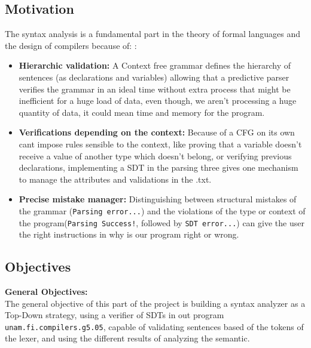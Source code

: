 \documentclass[letterpaper,12pt,oneside]{article}
\begin{document}
\subsection{Motivation}
The syntax analysis is a fundamental part in the theory of formal languages and the design of compilers because of: \cite{10.5555/576122}:
\begin{itemize}
    \item \textbf{Hierarchic validation:} A Context free grammar defines the hierarchy of sentences (as declarations and variables) allowing that a predictive parser verifies the grammar in an ideal time without extra process that might be inefficient for a huge load of data, even though, we aren't processing a huge quantity of data, it could mean time and memory for the program. 
    \item \textbf{Verifications depending on the context:} Because of a CFG on its own cant impose rules sensible to the context, like proving that a variable doesn't receive a value of another type which doesn't belong, or verifying previous declarations, implementing a SDT in the parsing three gives one mechanism to manage the attributes and validations in the .txt.
    \item \textbf{Precise mistake manager:} Distinguishing between structural mistakes of the grammar (\texttt{Parsing error...}) and the violations of the type or context of the program(\texttt{Parsing Success!}, followed by \texttt{SDT error...}) can give the user the right instructions in why is our program right or wrong.
\end{itemize}

\subsection{Objectives}
\textbf{General Objectives:} \\
The general objective of this part of the project is building a syntax analyzer as a Top-Down strategy, using a verifier of SDTs in out program \texttt{unam.fi.compilers.g5.05}, capable of validating sentences based of the tokens of the lexer, and using the different results of analyzing the semantic. 
\end{document}
